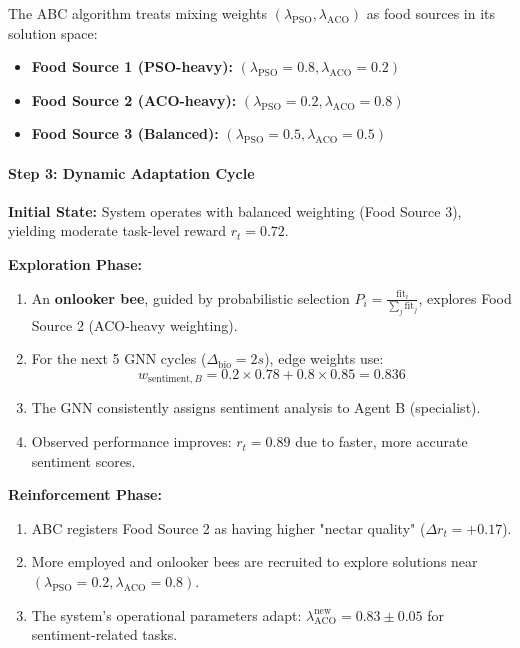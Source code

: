 \documentclass{article}
\begin{document}
The ABC algorithm treats mixing weights $(\lambda_{\text{PSO}}, \lambda_{\text{ACO}})$ as food sources in its solution space:

\begin{itemize}
\item \textbf{Food Source 1 (PSO-heavy):} $(\lambda_{\text{PSO}} = 0.8, \lambda_{\text{ACO}} = 0.2)$
\item \textbf{Food Source 2 (ACO-heavy):} $(\lambda_{\text{PSO}} = 0.2, \lambda_{\text{ACO}} = 0.8)$  
\item \textbf{Food Source 3 (Balanced):} $(\lambda_{\text{PSO}} = 0.5, \lambda_{\text{ACO}} = 0.5)$
\end{itemize}

\paragraph{Step 3: Dynamic Adaptation Cycle}

\textbf{Initial State:} System operates with balanced weighting (Food Source 3), yielding moderate task-level reward $r_t = 0.72$.

\textbf{Exploration Phase:}
\begin{enumerate}
\item An \textbf{onlooker bee}, guided by probabilistic selection $P_i = \frac{\text{fit}_i}{\sum_j \text{fit}_j}$, explores Food Source 2 (ACO-heavy weighting).
\item For the next 5 GNN cycles ($\Delta_{\text{bio}} = 2s$), edge weights use: 
   \begin{equation}
   w_{\text{sentiment},B} = 0.2 \times 0.78 + 0.8 \times 0.85 = 0.836
   \end{equation}
\item The GNN consistently assigns sentiment analysis to Agent B (specialist).
\item Observed performance improves: $r_t = 0.89$ due to faster, more accurate sentiment scores.
\end{enumerate}

\textbf{Reinforcement Phase:}
\begin{enumerate}
\item ABC registers Food Source 2 as having higher "nectar quality" ($\Delta r_t = +0.17$).
\item More employed and onlooker bees are recruited to explore solutions near $(\lambda_{\text{PSO}} = 0.2, \lambda_{\text{ACO}} = 0.8)$.
\item The system's operational parameters adapt: $\lambda_{\text{ACO}}^{\text{new}} = 0.83 \pm 0.05$ for sentiment-related tasks.
\end{enumerate}
\end{document}
